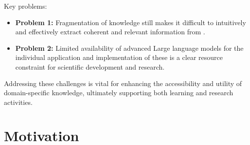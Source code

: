 Key problems:
\begin{itemize}
  \item \textbf{Problem 1:} Fragmentation of knowledge still makes it difficult to intuitively and effectively extract coherent and relevant information from \citet{bb2}.
  \item \textbf{Problem 2:} Limited availability of advanced Large language models for the individual application and implementation of these is a clear resource constraint for scientific development and research.
\end{itemize}
%
Addressing these challenges is vital for enhancing the accessibility and utility of domain-specific knowledge, ultimately supporting both learning and research activities. 
%
\section{Motivation}\label{sec:motivation}


